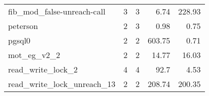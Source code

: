 \begin{tabular}{l|r|r|r|r}
{\color[HTML]{000000} fib\_mod\_false-unreach-call} & {\color[HTML]{656565} 3}                                                                                         & {\color[HTML]{000000} 3}                                                                 & {\color[HTML]{656565} 6.74}                                                                                 & {\color[HTML]{000000} 228.93}                                                      \\
peterson                                            & {\color[HTML]{656565} 2}                                                                                         & 3                                                                                        & {\color[HTML]{656565} 0.98}                                                                                 & 0.75                                                                               \\
{\color[HTML]{000000} pgsql0}                       & {\color[HTML]{656565} 2}                                                                                         & {\color[HTML]{000000} 2}                                                                 & {\color[HTML]{656565} 603.75}                                                                               & {\color[HTML]{000000} 0.71}                                                        \\
mot\_eg\_v2\_2                                      & {\color[HTML]{656565} 2}                                                                                         & 2                                                                                        & {\color[HTML]{656565} 14.77}                                                                                & 16.03                                                                              \\
{\color[HTML]{000000} read\_write\_lock\_2}         & {\color[HTML]{656565} 4}                                                                                         & {\color[HTML]{000000} 4}                                                                 & {\color[HTML]{656565} 92.7}                                                                                 & {\color[HTML]{000000} 4.53}                                                        \\
read\_write\_lock\_unreach\_13                      & {\color[HTML]{656565} 2}                                                                                         & 2                                                                                        & {\color[HTML]{656565} 208.74}                                                                               & 200.35                                                                            
\end{tabular}